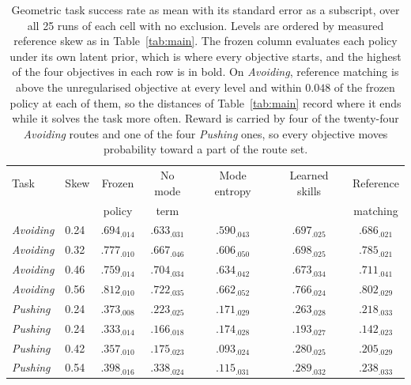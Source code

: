 \documentclass[preprint,12pt]{elsarticle}
\begin{document}
\begin{table}[t]
\caption{Geometric task success rate as mean with its standard error as a
subscript, over all 25 runs of each cell with no exclusion. Levels are ordered
by measured reference skew as in Table~\ref{tab:main}. The frozen column
evaluates each policy under its own latent prior, which is where every
objective starts, and the highest of the four objectives in each row is in
bold. On \emph{Avoiding}, reference matching is above the unregularised
objective at every level and within $0.048$ of the frozen policy at each of
them, so the distances of Table~\ref{tab:main} record where it ends while it
solves the task more often. Reward is carried by four of the twenty-four
\emph{Avoiding} routes and one of the four \emph{Pushing} ones, so every
objective moves probability toward a part of the route set.}
\label{tab:success}
\footnotesize
\begin{tabular*}{\textwidth}{@{\extracolsep{\fill}}llccccc@{}}
\toprule
Task & Skew & Frozen & No mode & Mode entropy & Learned skills & Reference \\
 &  & policy & term &  &  & matching \\
\midrule
\emph{Avoiding} & 0.24 & $.694_{.014}$ & $.633_{.031}$ & $.590_{.043}$ & $\mathbf{.697}_{.025}$ & $.686_{.021}$ \\
\emph{Avoiding} & 0.32 & $.777_{.010}$ & $.667_{.046}$ & $.606_{.050}$ & $.698_{.025}$ & $\mathbf{.785}_{.021}$ \\
\emph{Avoiding} & 0.46 & $.759_{.014}$ & $.704_{.034}$ & $.634_{.042}$ & $.673_{.034}$ & $\mathbf{.711}_{.041}$ \\
\emph{Avoiding} & 0.56 & $.812_{.010}$ & $.722_{.035}$ & $.662_{.052}$ & $.766_{.024}$ & $\mathbf{.802}_{.029}$ \\
\midrule
\emph{Pushing} & 0.24 & $.373_{.008}$ & $.223_{.025}$ & $.171_{.029}$ & $\mathbf{.263}_{.028}$ & $.218_{.033}$ \\
\emph{Pushing} & 0.24 & $.333_{.014}$ & $.166_{.018}$ & $.174_{.028}$ & $\mathbf{.193}_{.027}$ & $.142_{.023}$ \\
\emph{Pushing} & 0.42 & $.357_{.010}$ & $.175_{.023}$ & $.093_{.024}$ & $\mathbf{.280}_{.025}$ & $.205_{.029}$ \\
\emph{Pushing} & 0.54 & $.398_{.016}$ & $\mathbf{.338}_{.024}$ & $.115_{.031}$ & $.289_{.032}$ & $.238_{.033}$ \\
\bottomrule
\end{tabular*}
\end{table}
\end{document}
